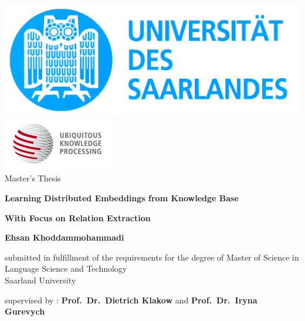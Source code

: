 \documentclass[a4paper, 11pt]{book}
\begin{document}
\frontmatter %

\thispagestyle{empty}
\begin{center}
\includegraphics{logo-saarbr-small.jpg}
\includegraphics{ukp-logo.jpg} \\
\vspace{2 cm}
\large{
Master's Thesis \\
}
\end{center}


\vspace{2 cm}
\centerline{\LARGE\textbf{Learning Distributed Embeddings from Knowledge Base}}
\centerline{\LARGE\textbf{With Focus on Relation Extraction}}



\vspace{2 cm}
\begin{center}
\textbf{Ehsan Khoddammohammadi \\}
\end{center}
\begin{center}
\large{
submitted in fulfillment of the requirements
for the degree of Master of Science in Language Science and Technology\\
Saarland University\\

}
\end{center}
\vspace{1 cm}
\begin{center}
\large{
supervised by : \textbf{Prof.~Dr.~Dietrich Klakow} and \textbf{Prof.~Dr.~Iryna
Gurevych}\\
}
\end{center}

\newpage
\end{document}
